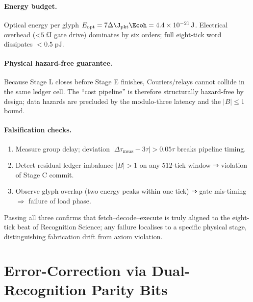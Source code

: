 \documentclass[11pt,oneside]{book}
\begin{document}
\paragraph{Energy budget.}
Optical energy per glyph  
\(E_{\mathrm{opt}} = 7\Delta\J_{\mathrm{pkt}}\Ecoh = 4.4\times10^{-21}\,\mathrm{J}\).
Electrical overhead  
(<\(\!5\;\mathrm{fJ}\) gate drive)
dominates by six orders;  
full eight-tick word dissipates \(<\!0.5\;\mathrm{pJ}\).

\paragraph{Physical hazard-free guarantee.}
Because Stage L closes before Stage E finishes,  
Couriers/relays cannot collide in the same ledger cell.  
The “cost pipeline” is therefore structurally hazard-free by design;  
data hazards are precluded by the modulo-three latency and the
\(|B|\le1\) bound.

\paragraph{Falsification checks.}
\begin{enumerate}[leftmargin=*,itemsep=3pt]
\item Measure group delay; deviation
      \(|\Delta\tau_{\mathrm{meas}} - 3\tau| > 0.05\tau\)
      breaks pipeline timing.
\item Detect residual ledger imbalance
      \(|B|>1\) on any 512-tick window ⇒ violation of Stage C commit.
\item Observe glyph overlap (two energy peaks within one tick)
      ⇒ gate mis-timing \(\Rightarrow\) failure of load phase.
\end{enumerate}

Passing all three confirms that fetch–decode–execute is truly aligned
to the eight-tick beat of Recognition Science;  
any failure localises to a specific physical stage, distinguishing
fabrication drift from axiom violation.


\section{Error-Correction via Dual-Recognition Parity Bits}
\label{sec:lnal-ec-narrative}
\end{document}
